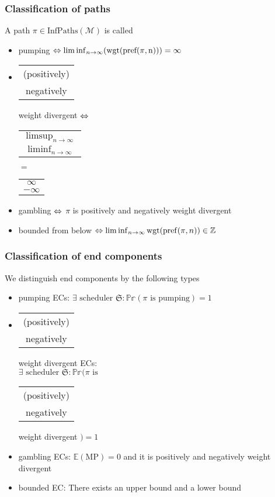 \documentclass[onlymath]{beamer}
\begin{document}
\begin{frame}
	\frametitle{Classification of paths}
	A path $\pi \in \mathrm{InfPaths}(\mathcal{M})$ is called 
	\begin{itemize}
		\item pumping $\ratio\Leftrightarrow \liminf_{n \to \infty}(\mathrm{wgt}(\mathrm{pref(\pi, n)})) = \infty$
		\item \begin{tabular}{c}(positively) \\ negatively \end{tabular} weight divergent $\ratio\Leftrightarrow$ \begin{tabular}{c} $\limsup_{n \to \infty}$ \\ $\liminf_{n \to \infty}$ \end{tabular} $=$ \begin{tabular}{c} ${\infty}$ \\ ${-\infty}$ \end{tabular}
		\item gambling $\ratio\Leftrightarrow$ $\pi$ is positively and negatively weight divergent
		\item bounded from below $\ratio\Leftrightarrow \liminf_{n \to \infty} \mathrm{wgt}(\mathrm{pref}(\pi,n)) \in \mathbb{Z}$
	\end{itemize}
\end{frame}

\begin{frame}
\frametitle{Classification of end components}
We distinguish end components by the following types
\begin{itemize}
	\item pumping ECs: $\exists \text{ scheduler } \mathfrak{S}: \mathbb{Pr}(\pi \text{ is pumping}) = 1$
	\item \begin{tabular}{c}(positively) \\ negatively \end{tabular} weight divergent ECs:\\ \hspace{-2ex}$\exists \text{ scheduler } \mathfrak{S}: \mathbb{Pr}\Big(\pi \text{ is }$ \begin{tabular}{c}(positively) \\ negatively \end{tabular} weight divergent $\Big) = 1$
	\item gambling ECs: $\mathbb{E}(\mathrm{MP}) = 0$ and it is positively and negatively weight divergent
	\item bounded EC: There exists an upper bound and a lower bound
\end{itemize}
\end{frame}
\end{document}
